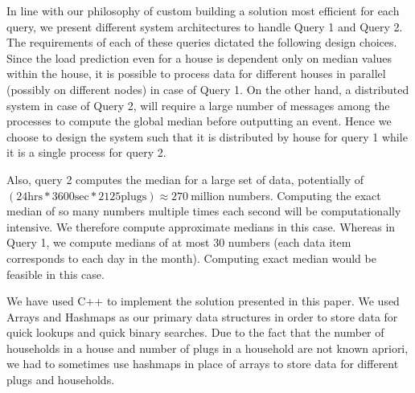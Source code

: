 In line with our philosophy of custom building a solution most efficient for each query, we present different system architectures to handle Query 1 and Query 2.
The requirements of each of these queries dictated the following design choices. Since the load prediction even for a house is dependent only on median values within the house, it is possible to process data for different houses in parallel (possibly on different nodes) in case of Query 1.
On the other hand, a distributed system in case of Query 2, will require a large number of messages among the processes to compute the global median before outputting an event. Hence we choose to design the system such that it is distributed by house for query 1 while it is a single process for query 2.

Also, query 2 computes the median for a large set of data, potentially  of $(24 \mbox{hrs} * 3600 \mbox{sec} * 2125 \mbox{plugs}) \approx 270 \ \mbox{million}$ numbers. Computing the exact median of so many numbers multiple times each second will be computationally intensive. We therefore compute approximate medians in this case. Whereas in Query 1, we compute medians of at most 30 numbers (each data item corresponds to each day in the month).
Computing exact median would be feasible in this case.

We have used C++ to implement the solution presented in this paper. We used Arrays and Hashmaps as our primary data structures in order to store data for quick lookups and quick binary searches. Due to the fact that the number of households in a house and number of plugs in a household are not known apriori, we had to sometimes use hashmaps in place of arrays to store data for different plugs and households.
